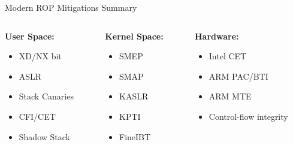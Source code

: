 \documentclass[aspectratio=169,12pt]{beamer}
\begin{document}
\begin{frame}{Modern ROP Mitigations Summary}
    \vspace{0.5cm}
    \begin{columns}
        \begin{column}{0.33\textwidth}
            \textbf{User Space:}
            \begin{itemize}
                \item XD/NX bit
                \item ASLR
                \item Stack Canaries
                \item CFI/CET
                \item Shadow Stack
            \end{itemize}
        \end{column}
        \begin{column}{0.33\textwidth}
            \textbf{Kernel Space:}
            \begin{itemize}
                \item SMEP
                \item SMAP
                \item KASLR
                \item KPTI
                \item FineIBT
            \end{itemize}
        \end{column}
        \begin{column}{0.33\textwidth}
            \textbf{Hardware:}
            \begin{itemize}
                \item Intel CET
                \item ARM PAC/BTI
                \item ARM MTE
                \item Control-flow integrity
            \end{itemize}
        \end{column}
    \end{columns}
\end{frame}
\end{document}
